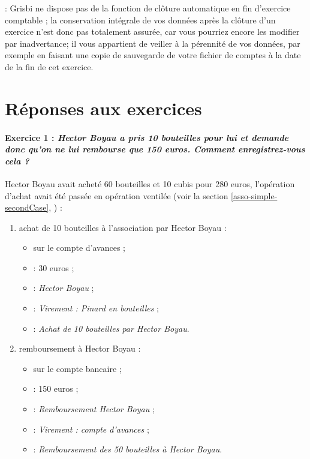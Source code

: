 \ifIllustration
\newpage
\fi

 : Grisbi ne dispose pas de la fonction de clôture automatique en fin d'exercice comptable ; la conservation intégrale de vos données après la clôture d'un exercice n'est donc pas totalement assurée, car vous pourriez encore les modifier par inadvertance; il vous appartient de veiller à la pérennité de vos données, par exemple en faisant une copie de sauvegarde de votre fichier de comptes à la date de la fin de cet exercice.

\ifIllustration
\newpage
\else
\fi


\section {Réponses aux exercices} \label{association-answer}

\paragraph{Exercice 1 :\label{association-answer-1} \emph{Hector Boyau a pris 10 bouteilles pour lui et demande donc qu'on ne lui rembourse que 150 euros. Comment enregistrez-vous cela ?}}

Hector Boyau avait acheté 60 bouteilles et 10 cubis pour 280 euros, l'opération d'achat avait été passée en opération ventilée (voir la section \vref{asso-simple-secondCase}, ) :

\begin{enumerate}
	\item achat de 10 bouteilles à l’association par Hector Boyau :
		\begin{itemize}
			\item sur le compte d'avances ; 
			\item {} : 30 euros ;
			\item {} : \emph{Hector Boyau} ;
			\item {} : \emph{Virement : Pinard en bouteilles} ;
			\item {} : \emph{Achat de 10 bouteilles par Hector Boyau}.
		\end{itemize}
	\item remboursement à Hector Boyau :
		\begin{itemize}
			\item sur le compte bancaire ; 
			\item {} : 150 euros ;
			\item {} : \emph{Remboursement Hector Boyau} ;
			\item {} : \emph{Virement : compte d’avances} ;
			\item {} : \emph{Remboursement des 50 bouteilles à Hector Boyau}.
		\end{itemize}
\end{enumerate}

